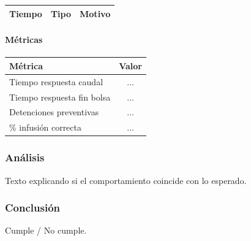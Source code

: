 \begin{table}[H]
\centering
\begin{tabular}{ccc}
\toprule
Tiempo & Tipo & Motivo \\
\bottomrule
\end{tabular}
\end{table}

\paragraph{Métricas}

\begin{table}[H]
\centering
\begin{tabular}{lc}
\toprule
Métrica & Valor \\
\midrule
Tiempo respuesta caudal & ... \\
Tiempo respuesta fin bolsa & ... \\
Detenciones preventivas & ... \\
\% infusión correcta & ... \\
\bottomrule
\end{tabular}
\end{table}

\subsubsection{Análisis}

Texto explicando si el comportamiento coincide con lo esperado.

\subsubsection{Conclusión}

Cumple / No cumple.
